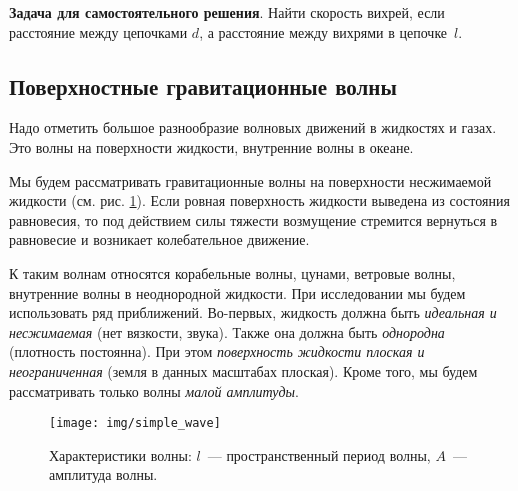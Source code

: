 \textbf{Задача для самостоятельного решения}. Найти скорость вихрей, если расстояние между цепочками $d$, а расстояние между вихрями в цепочке~$l$.



\newpage
\subsection{Поверхностные гравитационные волны}

Надо отметить большое разнообразие волновых движений в
жидкостях и газах. Это волны на поверхности жидкости, внутренние
волны в океане.

Мы будем рассматривать гравитационные волны на поверхности
несжимаемой жидкости (см. рис. \ref{fig:simplewave}). Если ровная поверхность жидкости выведена
из состояния равновесия, то под действием силы тяжести возмущение
стремится вернуться в равновесие и возникает колебательное движение.


К таким волнам относятся корабельные волны, цунами, ветровые волны, внутренние волны в неоднородной жидкости. При исследовании мы будем использовать ряд приближений. Во-первых, жидкость должна быть \textit{идеальная и несжимаемая} (нет вязкости, звука). Также она должна быть \textit{однородна} (плотность постоянна). При этом \textit{поверхность жидкости плоская и неограниченная} (земля в данных масштабах плоская). Кроме того, мы будем рассматривать только волны \textit{малой амплитуды}.

\begin{figure}[H]
    \centering
    \texttt{[image: img/simple\_wave]}
    \caption{Характеристики волны: $l$~--- пространственный период волны, $A$~--- амплитуда волны.}
    \label{fig:simplewave}
\end{figure}


